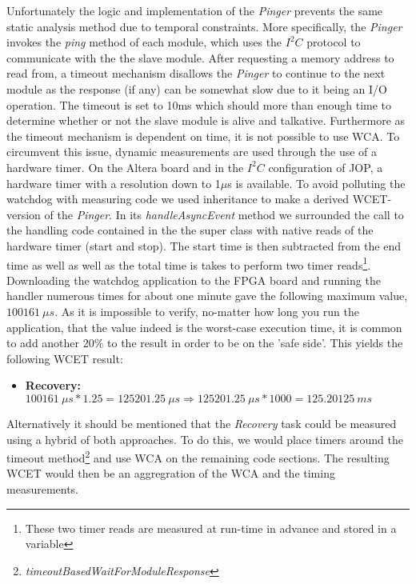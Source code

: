 Unfortunately the logic and implementation of the \textit{Pinger} prevents the same static analysis method due to temporal constraints. More specifically, the \textit{Pinger} invokes the \textit{ping} method of each module, which uses the $\textit{I}^2\textit{C}$ protocol to communicate with the the slave module. After requesting a memory address to read from, a timeout mechanism disallows the \textit{Pinger} to continue to the next module as the response (if any) can be somewhat slow due to it being an I/O operation. The timeout is set to 10ms which should more than enough time to determine whether or not the slave module is alive and talkative. Furthermore as the timeout mechanism is dependent on time, it is not possible to use WCA. To circumvent this issue, dynamic measurements are used through the use of a hardware timer. On the Altera board and in the $\textit{I}^2\textit{C}$ configuration of JOP, a hardware timer with a resolution down to 1$\mu$s is available. To avoid polluting the watchdog with measuring code we used inheritance to make a derived WCET-version of the \textit{Pinger}. In its \textit{handleAsyncEvent} method we surrounded the call to the handling code contained in the the super class with native reads of the hardware timer (start and stop). The start time is then subtracted from the end time as well as well as the total time is takes to perform two timer reads\footnote{These two timer reads are measured at run-time in advance and stored in a variable}. Downloading the watchdog application to the FPGA board and running the handler numerous times for about one minute gave the following maximum value, $100161\ \mu s $. As it is impossible to verify, no-matter how long you run the application, that the value indeed is the worst-case execution time, it is common to add another 20\% to the result in order to be on the 'safe side'. This yields the following WCET result:

\begin{itemize}
    \item \textbf{Recovery:} $100161\ \mu s * 1.25 = 125201.25\ \mu s \Rightarrow 125201.25\ \mu s * 1000 = 125.20125\ ms$
\end{itemize}

Alternatively it should be mentioned that the \textit{Recovery} task could be measured using a hybrid of both approaches. To do this, we would place timers around the timeout method\footnote{\textit{timeoutBasedWaitForModuleResponse}} and use WCA on the remaining code sections. The resulting WCET would then be an aggregration of the WCA and the timing measurements. 

